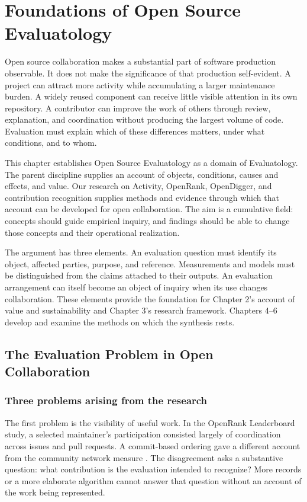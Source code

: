\chapter{Foundations of Open Source Evaluatology}
\label{ch:one}

Open source collaboration makes a substantial part of software production observable. It does not make the significance of that production self-evident. A project can attract more activity while accumulating a larger maintenance burden. A widely reused component can receive little visible attention in its own repository. A contributor can improve the work of others through review, explanation, and coordination without producing the largest volume of code. Evaluation must explain which of these differences matters, under what conditions, and to whom.

This chapter establishes Open Source Evaluatology as a domain of Evaluatology. The parent discipline supplies an account of objects, conditions, causes and effects, and value. Our research on Activity, OpenRank, OpenDigger, and contribution recognition supplies methods and evidence through which that account can be developed for open collaboration. The aim is a cumulative field: concepts should guide empirical inquiry, and findings should be able to change those concepts and their operational realization.

The argument has three elements. An evaluation question must identify its object, affected parties, purpose, and reference. Measurements and models must be distinguished from the claims attached to their outputs. An evaluation arrangement can itself become an object of inquiry when its use changes collaboration. These elements provide the foundation for Chapter 2's account of value and sustainability and Chapter 3's research framework. Chapters 4--6 develop and examine the methods on which the synthesis rests.

\section{The Evaluation Problem in Open Collaboration}
\label{sec:growth}

\subsection{Three problems arising from the research}
The first problem is the visibility of useful work. In the OpenRank Leaderboard study, a selected maintainer's participation consisted largely of coordination across issues and pull requests. A commit-based ordering gave a different account from the community network measure \citep[Section 4.1]{zhao2024}. The disagreement asks a substantive question: what contribution is the evaluation intended to recognize? More records or a more elaborate algorithm cannot answer that question without an account of the work being represented.

